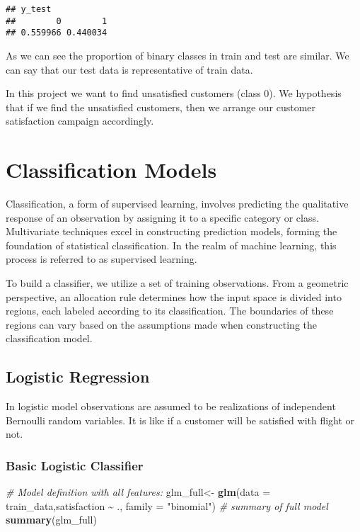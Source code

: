 \documentclass[
]{article}
\newenvironment{Shaded}{\begin{snugshade}}{\end{snugshade}}
\newcommand{\AttributeTok}[1]{\textcolor[rgb]{0.13,0.29,0.53}{#1}}
\newcommand{\CommentTok}[1]{\textcolor[rgb]{0.56,0.35,0.01}{\textit{#1}}}
\newcommand{\FunctionTok}[1]{\textcolor[rgb]{0.13,0.29,0.53}{\textbf{#1}}}
\newcommand{\NormalTok}[1]{#1}
\newcommand{\OtherTok}[1]{\textcolor[rgb]{0.56,0.35,0.01}{#1}}
\newcommand{\SpecialCharTok}[1]{\textcolor[rgb]{0.81,0.36,0.00}{\textbf{#1}}}
\newcommand{\StringTok}[1]{\textcolor[rgb]{0.31,0.60,0.02}{#1}}
\begin{document}
\begin{verbatim}
## y_test
##        0        1 
## 0.559966 0.440034
\end{verbatim}

As we can see the proportion of binary classes in train and test are
similar. We can say that our test data is representative of train data.

In this project we want to find unsatisfied customers (class 0). We
hypothesis that if we find the unsatisfied customers, then we arrange
our customer satisfaction campaign accordingly.

\hypertarget{classification-models}{%
\section{Classification Models}\label{classification-models}}

Classification, a form of supervised learning, involves predicting the
qualitative response of an observation by assigning it to a specific
category or class. Multivariate techniques excel in constructing
prediction models, forming the foundation of statistical classification.
In the realm of machine learning, this process is referred to as
supervised learning.

To build a classifier, we utilize a set of training observations. From a
geometric perspective, an allocation rule determines how the input space
is divided into regions, each labeled according to its classification.
The boundaries of these regions can vary based on the assumptions made
when constructing the classification model.

\hypertarget{logistic-regression}{%
\subsection{Logistic Regression}\label{logistic-regression}}

In logistic model observations are assumed to be realizations of
independent Bernoulli random variables. It is like if a customer will be
satisfied with flight or not.

\hypertarget{basic-logistic-classifier}{%
\subsubsection{Basic Logistic
Classifier}\label{basic-logistic-classifier}}

\begin{Shaded}
\begin{Highlighting}[]
\CommentTok{\# Model definition with all features:}
\NormalTok{glm\_full}\OtherTok{\textless{}{-}} \FunctionTok{glm}\NormalTok{(}\AttributeTok{data =}\NormalTok{ train\_data,satisfaction }\SpecialCharTok{\textasciitilde{}}\NormalTok{ .,}
                \AttributeTok{family =} \StringTok{"binomial"}\NormalTok{)}
\CommentTok{\# summary of full model}
\FunctionTok{summary}\NormalTok{(glm\_full)}
\end{Highlighting}
\end{Shaded}
\end{document}
